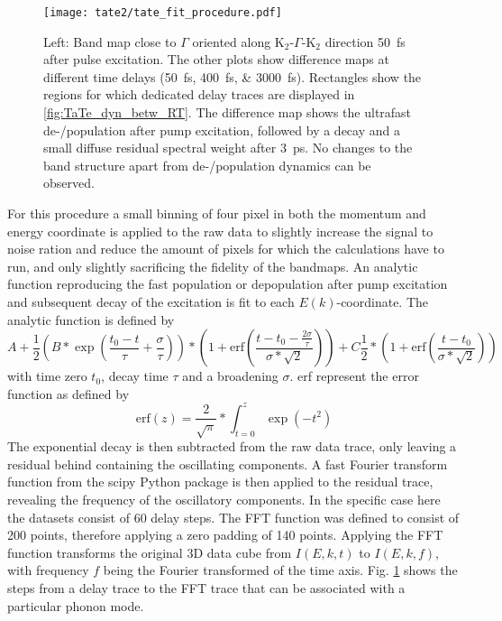 \begin{figure}[b!]
	\centering
	\texttt{[image: tate2/tate\_fit\_procedure.pdf]}
	\caption{Left: Band map close to $\Gamma$ oriented along K$_2$-$\Gamma$-K$_2$ direction \qty{50}{\femto\second} after pulse excitation. The other plots show difference maps at different time delays (\qtylist{50;400;3000}{\femto\second}). Rectangles show the regions for which dedicated delay traces are displayed in \ref{fig:TaTe_dyn_betw_RT}. The difference map shows the ultrafast de-/population after pump excitation, followed by a decay and a small diffuse residual spectral weight after \qty{3}{\pico\second}. No changes to the band structure apart from de-/population dynamics can be observed.}
	\label{fig:TaTe_fit_procedure}
\end{figure}

For this procedure a small binning of four pixel in both the momentum and energy coordinate is applied to the raw data to slightly increase the signal to noise ration and reduce the amount of pixels for which the calculations have to run, and only slightly sacrificing the fidelity of the bandmaps.
An analytic function reproducing the fast population or depopulation after pump excitation and subsequent decay of the excitation is fit to each $E(k)$-coordinate.
The analytic function is defined by
\begin{equation}
	A + \frac{1}{2} \left( B * \exp\left(\frac{t_0-t}{\tau} + \frac{\sigma}{\tau}\right) \right) * \left( 1 + \text{erf}\left(\frac{t-t_0-\frac{2\sigma}{\tau}}{\sigma*\sqrt{2}}\right) \right) + C \frac{1}{2} * \left( 1 + \text{erf}\left(\frac{t-t_0}{\sigma*\sqrt{2}}\right) \right)
	\label{eq:decay_model}
\end{equation}
with time zero $t_0$, decay time $\tau$ and a broadening $\sigma$.
erf represent the error function as defined by
\begin{equation}
	\text{erf}(z) = \frac{2}{\sqrt{\pi}} * \int_{t=0}^{z} \exp(-t^2)
\end{equation}
The exponential decay is then subtracted from the raw data trace, only leaving a residual behind containing the oscillating components.
A fast Fourier transform function from the scipy Python package \cite{noauthor_rfft_nodate} is then applied to the residual trace, revealing the frequency of the oscillatory components.
In the specific case here the datasets consist of 60 delay steps.
The FFT function was defined to consist of 200 points, therefore applying a zero padding of 140 points.
Applying the FFT function transforms the original 3D data cube from $I(E,k,t)$ to $I(E,k,f)$, with frequency $f$ being the Fourier transformed of the time axis.
Fig. \ref{fig:TaTe_fit_procedure} shows the steps from a delay trace to the FFT trace that can be associated with a particular phonon mode.

